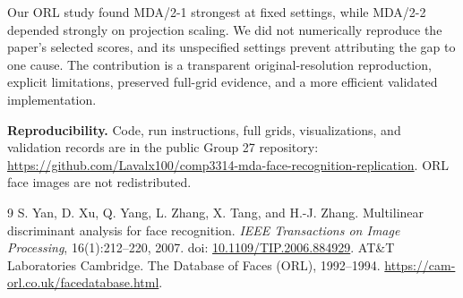 \documentclass{article}
\begin{document}
Our ORL study found MDA/2-1 strongest at fixed settings, while MDA/2-2 depended strongly on projection scaling. We did not numerically reproduce the paper's selected scores, and its unspecified settings prevent attributing the gap to one cause. The contribution is a transparent original-resolution reproduction, explicit limitations, preserved full-grid evidence, and a more efficient validated implementation.

\noindent\textbf{Reproducibility.} Code, run instructions, full grids, visualizations, and validation records are in the public Group 27 repository: \url{https://github.com/Lavalx100/comp3314-mda-face-recognition-replication}. ORL face images are not redistributed.

\begin{thebibliography}{9}
\small
{} S. Yan, D. Xu, Q. Yang, L. Zhang, X. Tang, and H.-J. Zhang. Multilinear discriminant analysis for face recognition. \emph{IEEE Transactions on Image Processing}, 16(1):212--220, 2007. doi: \href{https://doi.org/10.1109/TIP.2006.884929}{10.1109/TIP.2006.884929}.
 AT\&T Laboratories Cambridge. The Database of Faces (ORL), 1992--1994. \url{https://cam-orl.co.uk/facedatabase.html}.
\end{thebibliography}
\end{document}
